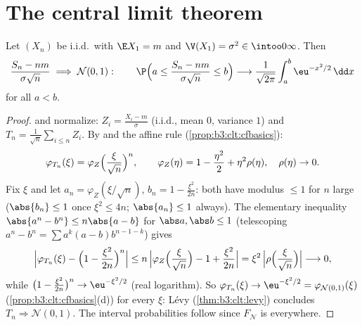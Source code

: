 \section{The central limit theorem}

\begin{theorem}\label{thm:b3:clt:clt}
Let $(X_n)$ be i.i.d.\ with $\E X_1 = m$ and $\V(X_1) =
\sigma^2 \in \intoo0\infty$. Then
\[
\frac{S_n - nm}{\sigma\sqrt n} \;\Longrightarrow\; \mathcal
N(0, 1) :
\qquad
\P\Bigl(a \leq \frac{S_n - nm}{\sigma\sqrt n} \leq
b\Bigr) \longrightarrow
\frac{1}{\sqrt{2\pi}}\int_a^b\eu^{-x^2/2}\,\dd x
\]
for all $a < b$.
\end{theorem}

\begin{proof}
 and normalize: $Z_i = \frac{X_i - m}{\sigma}$
(i.i.d., mean $0$, variance $1$) and $T_n =
\frac1{\sqrt n}\sum_{i\leq n}Z_i$. By  and the
affine rule (\cref{prop:b3:clt:cfbasics}):
\[
\varphi_{T_n}(\xi) =
\varphi_{Z}\Bigl(\frac{\xi}{\sqrt n}\Bigr)^{n},
\qquad
\varphi_Z(\eta) = 1 - \frac{\eta^2}2 + \eta^2\rho(\eta),\quad
\rho(\eta)\to0 .
\]
Fix $\xi$ and let $a_n = \varphi_Z(\xi/\sqrt n)$, $b_n = 1 -
\frac{\xi^2}{2n}$: both have modulus $\leq 1$ for $n$ large
($\abs{b_n} \leq 1$ once $\xi^2 \leq 4n$; $\abs{a_n} \leq 1$
always). The elementary inequality $\abs{a^n - b^n} \leq
n\abs{a - b}$ for $\abs a, \abs b \leq 1$ (telescoping
$a^n - b^n = \sum a^k(a - b)b^{n-1-k}$) gives
\[
\Bigl|\varphi_{T_n}(\xi) - \Bigl(1 -
\frac{\xi^2}{2n}\Bigr)^{n}\Bigr|
\leq n\,\Bigl|\varphi_Z\Bigl(\frac\xi{\sqrt n}\Bigr) - 1 +
\frac{\xi^2}{2n}\Bigr|
= \xi^2\,\Bigl|\rho\Bigl(\frac{\xi}{\sqrt n}\Bigr)\Bigr|
\longrightarrow 0,
\]
while $\bigl(1 - \frac{\xi^2}{2n}\bigr)^n \to
\eu^{-\xi^2/2}$ (real logarithm). So $\varphi_{T_n}(\xi) \to
\eu^{-\xi^2/2} = \varphi_{\mathcal N(0,1)}(\xi)$
(\cref{prop:b3:clt:cfbasics}(d)) for every $\xi$: L\'evy
(\cref{thm:b3:clt:levy}) concludes $T_n \Rightarrow \mathcal
N(0,1)$. The interval probabilities follow since $F_{\mathcal
N}$ is  everywhere.
\end{proof}

